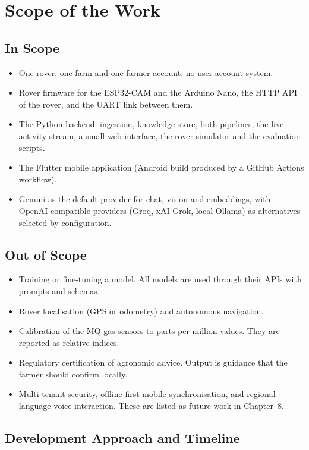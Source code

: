 \section{Scope of the Work}

\subsection{In Scope}

\begin{itemize}
\item One rover, one farm and one farmer account; no user-account system.
\item Rover firmware for the ESP32-CAM and the Arduino Nano, the HTTP API of the rover, and the UART link between
      them.
\item The Python backend: ingestion, knowledge store, both pipelines, the live activity stream, a small web
      interface, the rover simulator and the evaluation scripts.
\item The Flutter mobile application (Android build produced by a GitHub Actions workflow).
\item Gemini as the default provider for chat, vision and embeddings, with OpenAI-compatible providers (Groq, xAI Grok,
      local Ollama) as alternatives selected by configuration.
\end{itemize}

\subsection{Out of Scope}

\begin{itemize}
\item Training or fine-tuning a model. All models are used through their APIs with prompts and schemas.
\item Rover localisation (GPS or odometry) and autonomous navigation.
\item Calibration of the MQ gas sensors to parts-per-million values. They are reported as relative indices.
\item Regulatory certification of agronomic advice. Output is guidance that the farmer should confirm locally.
\item Multi-tenant security, offline-first mobile synchronisation, and regional-language voice interaction. These are
      listed as future work in Chapter~8.
\end{itemize}

\subsection{Development Approach and Timeline}


